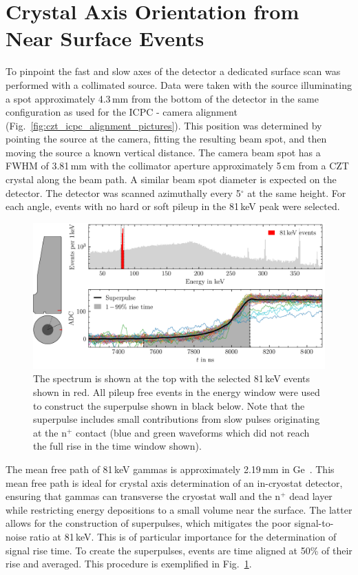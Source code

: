 \section{Crystal Axis Orientation from Near Surface Events}\label{sec:crystal_axis_Ba}
To pinpoint the fast and slow axes of the detector a dedicated surface scan was performed with a collimated \BaS{} source. Data were taken with the source illuminating a spot approximately 4.3\,mm from the bottom of the detector in the same configuration as used for the ICPC - camera alignment (Fig.~\ref{fig:czt_icpc_alignment_pictures}). This position was determined by pointing the source at the camera, fitting the resulting beam spot, and then moving the source a known vertical distance. The camera beam spot has a FWHM of 3.81\,mm with the collimator aperture approximately 5\,cm from a CZT crystal along the beam path. A similar beam spot diameter is expected on the detector. The detector was scanned azimuthally every 5$^\circ$ at the same height. For each angle, events with no hard or soft pileup in the 81\,keV peak were selected. 
\begin{figure}[H]
    \centering
    \includegraphics[width=6in]{figs/pipeline/Ba_superpulse.png}
    \caption{The \BaS{} spectrum is shown at the top with the selected 81\,keV events shown in red. All pileup free events in the energy window were used to construct the superpulse shown in black below. Note that the superpulse includes small contributions from slow pulses originating at the n$^+$ contact (blue and green waveforms which did not reach the full rise in the time window shown).}
    \label{fig:Ba_superpulse}
\end{figure}

The mean free path of 81\,keV gammas is approximately 2.19\,mm in Ge~\cite{NIST}. This mean free path is ideal for crystal axis determination of an in-cryostat detector, ensuring that gammas can transverse the cryostat wall and the n$^+$ dead layer while restricting energy depositions to a small volume near the surface. The latter allows for the construction of superpulses, which mitigates the poor signal-to-noise ratio at 81\,keV. This is of particular importance for the determination of signal rise time. To create the \BaS{} superpulses, events are time aligned at 50\% of their rise and averaged. This procedure is exemplified in Fig.~\ref{fig:Ba_superpulse}. 

